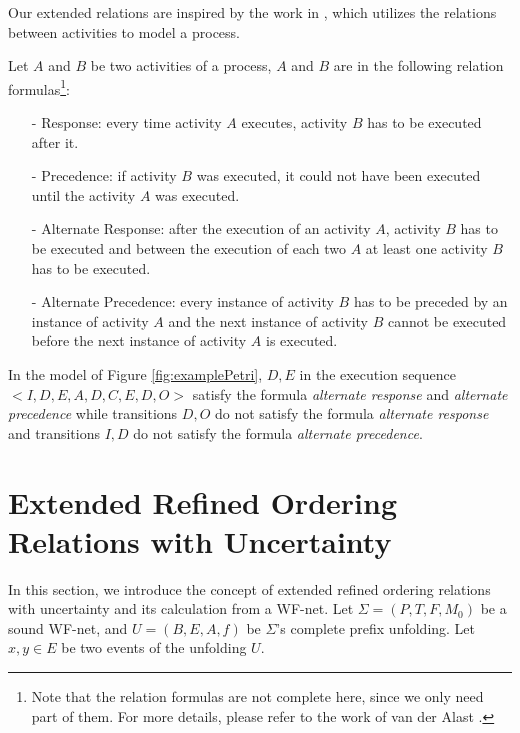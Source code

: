 \documentclass{llncs}
\begin{document}
Our extended relations are inspired by the work in \cite{van2006decserflow}, which utilizes the relations between activities to model a process.
\begin{definition}\label{def:relationFormulas}
Let $A$ and $B$ be two activities of a process, $A$ and $B$ are in the following relation formulas\footnote{Note that the relation formulas are not complete here, since we only need part of them. For more details, please refer to the work of van der Alast \cite{van2006decserflow}.}:
	\begin{itemize}
		\item[-] Response: every time activity $A$ executes, activity $B$ has to be executed after it.
		\item[-] Precedence: if activity $B$ was executed, it could not have been executed until the activity $A$ was executed.
		\item[-] Alternate Response: after the execution of an activity $A$, activity $B$ has to be executed and between the execution of each two $A$ at least one activity $B$ has to be executed.
		\item[-] Alternate Precedence: every instance of activity $B$ has to be preceded by an instance of activity $A$ and the next instance of activity $B$ cannot be executed before the next instance of activity $A$ is executed.
	\end{itemize}
\end{definition}

\begin{example}\label{ex:relationFormulas}
In the model of Figure \ref{fig:examplePetri}, $D,E$ in the execution sequence $<I,D,E,A,D,C,E,D,O>$ satisfy the formula \textit{alternate response} and \textit{alternate precedence} while transitions $D,O$ do not satisfy the formula \textit{alternate response} and transitions $I,D$ do not satisfy the formula \textit{alternate precedence}.
\end{example}

\section{Extended Refined Ordering Relations with Uncertainty}\label{sec:relations}
In this section, we introduce the concept of extended refined ordering relations with uncertainty and its calculation from a WF-net. Let $\Sigma=(P,T,F,M_{0})$ be a sound WF-net, and $U=(B,E,A,f)$ be $\Sigma$'s complete prefix unfolding. Let $x,y\in E$ be two events of the unfolding $U$.
\end{document}
